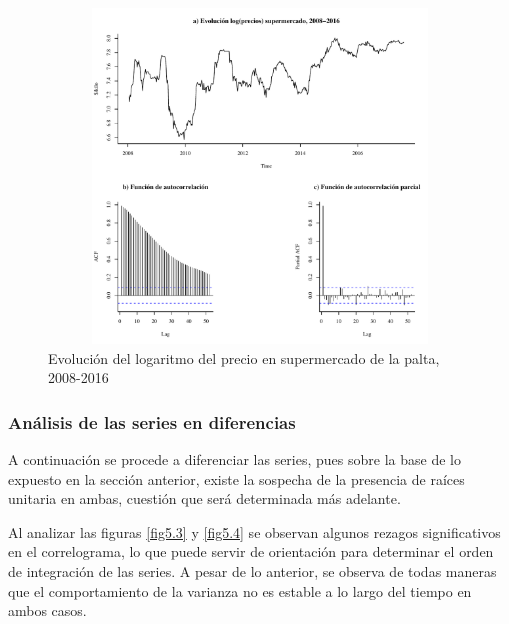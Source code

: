 \documentclass[12pt, twoside]{book}\usepackage[]{graphicx}\usepackage[]{color}
\newenvironment{knitrout}{}{} %
\numberwithin{equation}{section}
\numberwithin{theorem}{section}
\numberwithin{teorema}{section}
\numberwithin{defi}{section}
\numberwithin{prop}{section}
\numberwithin{defi}{section}
\theoremstyle{plain}
\begin{document}
\begin{knitrout}
\color{fgcolor}\begin{figure}[!htpb]

{\centering \includegraphics[width=4.5in,height=3.5in]{figure/fig-2_2-1} 

}

\caption{Evolución del logaritmo del precio en supermercado de la palta, 2008-2016\label{fig5.2}}\label{fig:fig-2.2}
\end{figure}


\end{knitrout}

\subsubsection{Análisis de las series en diferencias}

A continuación se procede a diferenciar las series, pues sobre la base de lo expuesto en la sección anterior, existe la sospecha de la presencia de raíces unitaria en ambas, cuestión que será determinada más adelante.

Al analizar las figuras \ref{fig5.3} y \ref{fig5.4} se observan algunos rezagos significativos en el correlograma, lo que puede servir de orientación para determinar el orden de integración de las series. A pesar de lo anterior, se observa de todas maneras que el comportamiento de la varianza no es estable a lo largo del tiempo en ambos casos.  
\end{document}
